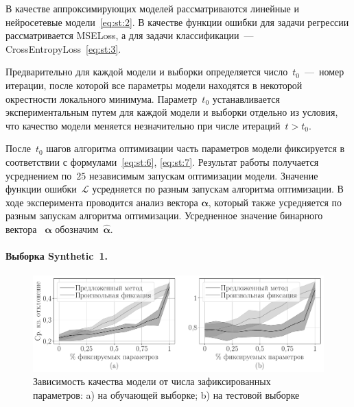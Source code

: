 В качестве аппроксимирующих моделей рассматриваются линейные и нейросетевые модели~\eqref{eq:st:2}. В качестве функции ошибки для задачи регрессии рассматривается MSELoss, а для задачи классификации~--- CrossEntropyLoss~\eqref{eq:st:3}.

Предварительно для каждой модели и выборки определяется число~$t_0$~---~номер итерации, после которой все параметры модели находятся в некоторой окрестности локального минимума. Параметр~$t_0$ устанавливается экспериментальным путем для каждой модели и выборки отдельно из условия, что качество модели меняется незначительно при числе итераций~$t>t_0$.

После~$t_0$ шагов алгоритма оптимизации часть параметров модели фиксируется в соответствии с формулами~\eqref{eq:st:6}, \eqref{eq:st:7}. Результат работы получается усреднением по~$25$ независимым запускам оптимизации модели. Значение функции ошибки~$\mathcal{L}$ усредняется по разным запускам алгоритма оптимизации. В ходе эксперимента проводится анализ вектора $\bm{\alpha}$, который также усредняется по разным запускам алгоритма оптимизации. Усредненное значение бинарного вектора ~$\bm{\alpha}$ обозначим~$\hat{\bm{\alpha}}$.


\paragraph{Выборка Synthetic~1.}

\begin{figure}[h!t]\center
\includegraphics[width=1\textwidth]{results/order/generate_data_neural_loss}
\caption{Зависимость качества модели от числа зафиксированных параметров: a) на обучающей выборке; b) на тестовой выборке}
\label{fg:ex:syn3:1}
\end{figure}

